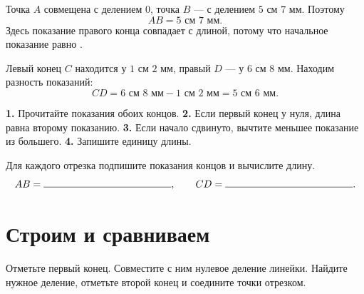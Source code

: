 \correctmeasurementfigure

\begin{fillbox}
  Точка $A$ совмещена с делением $0$, точка $B$ — с делением
  $5\text{ см }7\text{ мм}$. Поэтому
  \[
    AB=5\text{ см }7\text{ мм}.
  \]
  Здесь показание правого конца совпадает с длиной, потому что начальное
  показание равно \answerblank[14mm].
\end{fillbox}

\shiftedmeasurementfigure

\begin{fillbox}
  Левый конец $C$ находится у $1\text{ см }2\text{ мм}$, правый $D$ —
  у $6\text{ см }8\text{ мм}$. Находим разность показаний:
  \[
    CD=6\text{ см }8\text{ мм}-1\text{ см }2\text{ мм}
      =5\text{ см }6\text{ мм}.
  \]
\end{fillbox}

\begin{notebox}
  \textbf{1.} Прочитайте показания обоих концов.
  \textbf{2.} Если первый конец у нуля, длина равна второму показанию.
  \textbf{3.} Если начало сдвинуто, вычтите меньшее показание из большего.
  \textbf{4.} Запишите единицу длины.
\end{notebox}

\readrulerpracticefigure

\begin{practicebox}
  Для каждого отрезка подпишите показания концов и вычислите длину.
  \[
    AB=\answerblank[45mm],\qquad CD=\answerblank[45mm].
  \]
\end{practicebox}

\section{Строим и сравниваем}

\constructionalgorithmfigure

\begin{notebox}
  Отметьте первый конец. Совместите с ним нулевое деление линейки. Найдите
  нужное деление, отметьте второй конец и соедините точки отрезком.
\end{notebox}

\begin{practicebox}
  \studentconstructionfigure
\end{practicebox}

